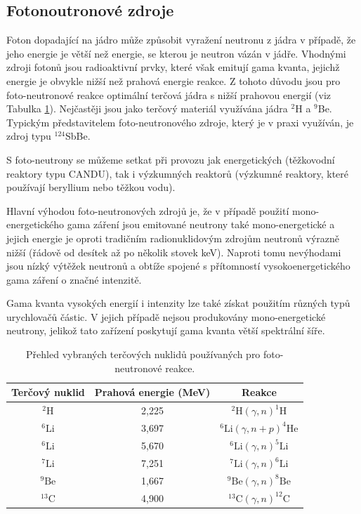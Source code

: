 \subsection{Fotonoutronové zdroje}

Foton dopadající na jádro může způsobit vyražení neutronu z jádra v případě, že jeho energie je větší než energie, se kterou je neutron vázán v jádře. Vhodnými zdroji fotonů jsou radioaktivní prvky, které však emitují gama kvanta, jejichž energie je obvykle nižší než prahová energie reakce. Z tohoto důvodu jsou pro foto-neutronové reakce optimální terčová jádra s nižší prahovou energií (viz Tabulka \ref{tab:fotoneutronove_reakce}). Nejčastěji jsou jako terčový materiál využívána jádra $^2$H a $^9$Be. Typickým představitelem foto-neutronového zdroje, který je v praxi využíván, je zdroj typu $^{124}$SbBe. 

S foto-neutrony se můžeme setkat při provozu jak energetických (těžkovodní reaktory typu CANDU), tak i výzkumných reaktorů (výzkumné reaktory, které používají beryllium nebo těžkou vodu).

Hlavní výhodou foto-neutronových zdrojů je, že v případě použití mono-energetického gama záření jsou emitované neutrony také mono-energetické a jejich energie je oproti tradičním radionuklidovým zdrojům neutronů výrazně nižší (řádově od desítek až po několik stovek keV). Naproti tomu nevýhodami jsou nízký výtěžek neutronů a obtíže spojené s přítomností vysokoenergetického gama záření o značné intenzitě.

Gama kvanta vysokých energií i intenzity lze také získat použitím různých typů urychlovačů částic. V jejich případě nejsou produkovány mono-energetické neutrony, jelikož tato zařízení poskytují gama kvanta větší spektrální šíře.

\begin{table}[h!]
\centering
\caption{Přehled vybraných terčových nuklidů používaných pro foto-neutronové reakce.}
\label{tab:fotoneutronove_reakce}
\begin{tabular}{ccc}
\toprule
\textbf{Terčový nuklid} & \textbf{Prahová energie (MeV)} & \textbf{Reakce} \\ \midrule
$^2\text{H}$            & 2,225                         & $^2\text{H}(\gamma, n)^1\text{H}$ \\ 
$^6\text{Li}$           & 3,697                         & $^6\text{Li}(\gamma, n + p)^4\text{He}$ \\ 
$^6\text{Li}$           & 5,670                         & $^6\text{Li}(\gamma, n)^5\text{Li}$ \\ 
$^7\text{Li}$           & 7,251                         & $^7\text{Li}(\gamma, n)^6\text{Li}$ \\ 
$^9\text{Be}$           & 1,667                         & $^9\text{Be}(\gamma, n)^8\text{Be}$ \\ 
$^{13}\text{C}$         & 4,900                         & $^{13}\text{C}(\gamma, n)^{12}\text{C}$ \\ \bottomrule
\end{tabular}

\end{table}


